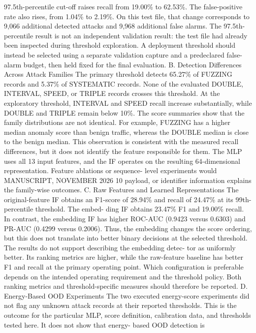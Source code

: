 \documentclass[
]{article}
\begin{document}
97.5th-percentile cut-off raises recall from 19.00\% to 62.53\%. The
false-positive rate also rises, from 1.04\% to 2.19\%. On this test
file, that change corresponds to 9,066 additional detected attacks and
9,968 additional false alarms. The 97.5th-percentile result is not an
independent validation result: the test file had already been inspected
during threshold exploration. A deployment threshold should instead be
selected using a separate validation capture and a predeclared
false-alarm budget, then held fixed for the final evaluation. B.
Detection Differences Across Attack Families The primary threshold
detects 65.27\% of FUZZING records and 5.37\% of SYSTEMATIC records.
None of the evaluated DOUBLE, INTERVAL, SPEED, or TRIPLE records crosses
this threshold. At the exploratory threshold, INTERVAL and SPEED recall
increase substantially, while DOUBLE and TRIPLE remain below 10\%. The
score summaries show that the family distributions are not identical.
For example, FUZZING has a higher median anomaly score than benign
traffic, whereas the DOUBLE median is close to the benign median. This
observation is consistent with the measured recall differences, but it
does not identify the feature responsible for them. The MLP uses all 13
input features, and the IF operates on the resulting 64-dimensional
representation. Feature ablations or sequence- level experiments would
MANUSCRIPT, NOVEMBER 2026 10 payload, or identifier information explains
the family-wise outcomes. C. Raw Features and Learned Representations
The original-feature IF obtains an F1-score of 28.94\% and recall of
24.47\% at its 99th-percentile threshold. The embed- ding IF obtains
23.47\% F1 and 19.00\% recall. In contrast, the embedding IF has higher
ROC-AUC (0.9423 versus 0.6303) and PR-AUC (0.4299 versus 0.2006). Thus,
the embedding changes the score ordering, but this does not translate
into better binary decisions at the selected threshold. The results do
not support describing the embedding detec- tor as uniformly better. Its
ranking metrics are higher, while the raw-feature baseline has better F1
and recall at the primary operating point. Which configuration is
preferable depends on the intended operating requirement and the
threshold policy. Both ranking metrics and threshold-specific measures
should therefore be reported. D. Energy-Based OOD Experiments The two
executed energy-score experiments did not flag any unknown attack
records at their reported thresholds. This is the outcome for the
particular MLP, score definition, calibration data, and thresholds
tested here. It does not show that energy- based OOD detection is
\end{document}
